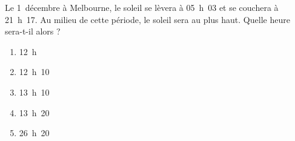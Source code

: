 Le 1\ier\ décembre à Melbourne, le soleil se lèvera à 05~h~03 et se couchera à 21~h~17. Au milieu de cette période, le soleil sera au plus haut. Quelle heure sera-t-il alors ?
\begin{multicols}{5}
  \begin{enumerate}[A/]
  \item 12~h
  \item 12~h~10
  \item 13~h~10
  \item 13~h~20
  \item 26~h~20
  \end{enumerate}
\end{multicols}